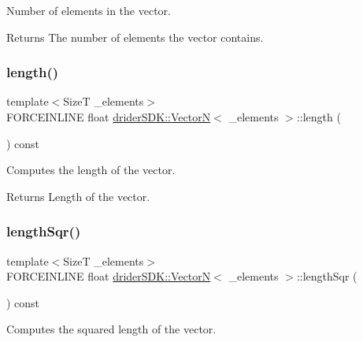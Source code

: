 Number of elements in the vector.

\begin{DoxyReturn}{Returns}
The number of elements the vector contains. 
\end{DoxyReturn}
\mbox{\label{classdrider_s_d_k_1_1_vector_n_af753c889a14e3c1a9c65b6069ca74125}} 
\subsubsection{\texorpdfstring{length()}{length()}}
{\footnotesize\ttfamily template$<$SizeT \+\_\+elements$>$ \\
F\+O\+R\+C\+E\+I\+N\+L\+I\+NE float \hyperlink{classdrider_s_d_k_1_1_vector_n}{drider\+S\+D\+K\+::\+VectorN}$<$ \+\_\+elements $>$\+::length (\begin{DoxyParamCaption}{ }\end{DoxyParamCaption}) const\hspace{0.3cm}{\ttfamily [inline]}}

Computes the length of the vector.

\begin{DoxyReturn}{Returns}
Length of the vector. 
\end{DoxyReturn}
\mbox{\label{classdrider_s_d_k_1_1_vector_n_a2bb749769feebfc048289194481a553b}} 
\subsubsection{\texorpdfstring{length\+Sqr()}{lengthSqr()}}
{\footnotesize\ttfamily template$<$SizeT \+\_\+elements$>$ \\
F\+O\+R\+C\+E\+I\+N\+L\+I\+NE float \hyperlink{classdrider_s_d_k_1_1_vector_n}{drider\+S\+D\+K\+::\+VectorN}$<$ \+\_\+elements $>$\+::length\+Sqr (\begin{DoxyParamCaption}{ }\end{DoxyParamCaption}) const\hspace{0.3cm}{\ttfamily [inline]}}

Computes the squared length of the vector.

